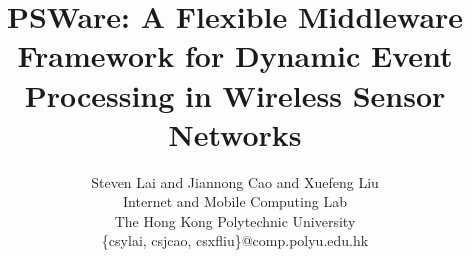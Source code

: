 \title{PSWare: A Flexible Middleware Framework for Dynamic Event Processing in Wireless Sensor Networks}
\author{Steven Lai and Jiannong Cao and Xuefeng Liu
	\\Internet and Mobile Computing Lab
	\\ The Hong Kong Polytechnic University
	\\ \{csylai, csjcao, csxfliu\}@comp.polyu.edu.hk
}
\maketitle